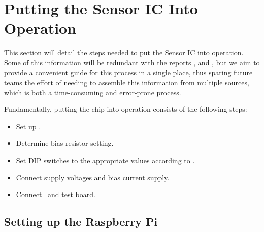 \clearpage
\section{Putting the Sensor IC Into Operation}
\label{sec:ICintoOperation}

This  section  will  detail  the  steps  needed to  put  the  Sensor  IC  into
operation. Some  of  this  information  will be  redundant  with  the  reports
\cite{ref:burgherr},  \cite{ref:gloor} and  \cite{ref:baier},  but  we aim  to
provide a  convenient guide for this  process in a single  place, thus sparing
future teams the effort of needing  to assemble this information from multiple
sources, which is both a time-consuming and error-prone process.

Fundamentally, putting the chip into operation consists of the following steps:
\begin{itemize}\tightlist
    \item
        Set up \raspi.
    \item
        Determine bias resistor setting.
    \item
        Set   DIP   switches   to   the  appropriate   values   according   to
        .
    \item
        Connect supply voltages and bias current supply.
    \item
        Connect \raspi~and test board.
\end{itemize}

\subsection{Setting up the Raspberry Pi}
\label{subsec:raspiInstall}



